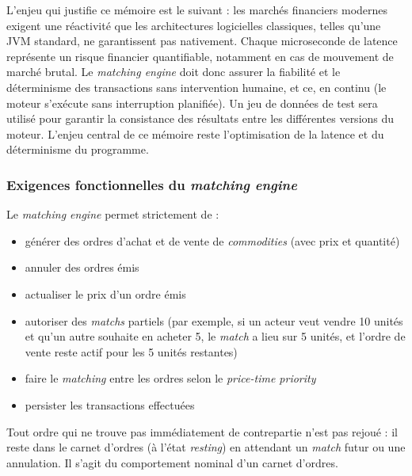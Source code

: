 L'enjeu qui justifie ce mémoire est le suivant : les marchés financiers modernes exigent une réactivité que les architectures logicielles classiques, telles qu'une JVM standard, ne garantissent pas nativement. Chaque microseconde de latence représente un risque financier quantifiable, notamment en cas de mouvement de marché brutal. Le \textit{matching engine} doit donc assurer la fiabilité et le déterminisme des transactions sans intervention humaine, et ce, en continu (le moteur s'exécute sans interruption planifiée). Un jeu de données de test sera utilisé pour garantir la consistance des résultats entre les différentes versions du moteur. L'enjeu central de ce mémoire reste l'optimisation de la latence et du déterminisme du programme.

\subsubsection{Exigences fonctionnelles du \textit{matching engine}}

Le \textit{matching engine} permet strictement de :

\begin{itemize}
    \item générer des ordres d'achat et de vente de \textit{commodities} (avec prix et quantité)
    \item annuler des ordres émis
    \item actualiser le prix d'un ordre émis
    \item autoriser des \textit{matchs} partiels (par exemple, si un acteur veut vendre 10 unités et qu'un autre souhaite en acheter 5, le \textit{match} a lieu sur 5 unités, et l'ordre de vente reste actif pour les 5 unités restantes)
    \item faire le \textit{matching} entre les ordres selon le \textit{price-time priority}
    \item persister les transactions effectuées
\end{itemize}

Tout ordre qui ne trouve pas immédiatement de contrepartie n'est pas rejoué : il reste dans le carnet d'ordres (à l'état \textit{resting}) en attendant un \textit{match} futur ou une annulation. Il s'agit du comportement nominal d'un carnet d'ordres.

